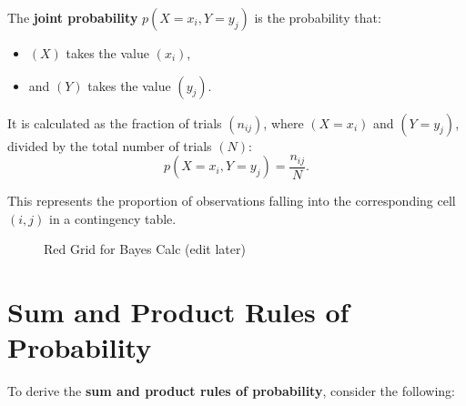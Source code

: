 \documentclass[
  12 pt,
  a4paper,
]{book}
\providecommand{\tightlist}{%
  \setlength{\itemsep}{0pt}\setlength{\parskip}{0pt}}
\numberwithin{equation}{section}
\theoremstyle{plain}      %
\theoremstyle{definition} %
\theoremstyle{remark}     %
\theoremstyle{note}         %
\begin{document}
The \textbf{joint probability} \(p(X = x_i, Y = y_j)\) is the
probability that:

\begin{itemize}
\tightlist
\item
  \((X)\) takes the value \((x_i)\),
\item
  and \((Y)\) takes the value \((y_j)\).
\end{itemize}

It is calculated as the fraction of trials \((n_{ij})\), where
\((X = x_i)\) and \((Y = y_j)\), divided by the total number of trials
\((N)\): \[
p(X = x_i, Y = y_j) = \frac{n_{ij}}{N}.
\]

This represents the proportion of observations falling into the
corresponding cell \((i, j)\) in a contingency table.

\begin{figure}[htbp]
\centering
{} 
\caption{Red Grid for Bayes Calc (edit later)}
\label{fig:red_bayes_grid}
\end{figure}

\hypertarget{sum-and-product-rules-of-probability}{%
\section{Sum and Product Rules of
Probability}\label{sum-and-product-rules-of-probability}}

To derive the \textbf{sum and product rules of probability}, consider
the following:
\end{document}

